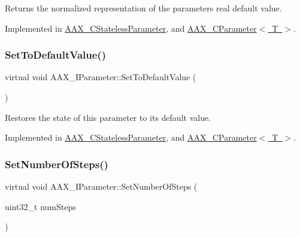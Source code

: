 Returns the normalized representation of the parameter\textquotesingle{}s real default value. 



Implemented in \mbox{\hyperlink{a01541_a1b7fd3909bedaf90b33f6db681add351}{A\+A\+X\+\_\+\+C\+Stateless\+Parameter}}, and \mbox{\hyperlink{a01537_a9897b66c035ec5ae306f641728769abb}{A\+A\+X\+\_\+\+C\+Parameter$<$ T $>$}}.

\mbox{\label{a01857_a29da0f77778437b19f1c8a666558357a}} 
\subsubsection{\texorpdfstring{SetToDefaultValue()}{SetToDefaultValue()}}
{\footnotesize\ttfamily virtual void A\+A\+X\+\_\+\+I\+Parameter\+::\+Set\+To\+Default\+Value (\begin{DoxyParamCaption}{ }\end{DoxyParamCaption})\hspace{0.3cm}{\ttfamily [pure virtual]}}



Restores the state of this parameter to its default value. 



Implemented in \mbox{\hyperlink{a01541_a94266dd40a437b425a88b5a4d848bad3}{A\+A\+X\+\_\+\+C\+Stateless\+Parameter}}, and \mbox{\hyperlink{a01537_a9ae87f0a8655c68ac7c59bec3f476c48}{A\+A\+X\+\_\+\+C\+Parameter$<$ T $>$}}.

\mbox{\label{a01857_ac81903d0388a03045a57dd4c455b6f02}} 
\subsubsection{\texorpdfstring{SetNumberOfSteps()}{SetNumberOfSteps()}}
{\footnotesize\ttfamily virtual void A\+A\+X\+\_\+\+I\+Parameter\+::\+Set\+Number\+Of\+Steps (\begin{DoxyParamCaption}\item[{uint32\+\_\+t}]{num\+Steps }\end{DoxyParamCaption})\hspace{0.3cm}{\ttfamily [pure virtual]}}



